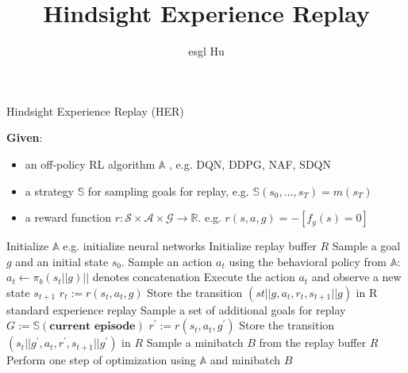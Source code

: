 \documentclass[12pt,a4paper]{article}
\begin{document}
\title{Hindsight Experience Replay}
\author{esgl Hu}
\maketitle
\begin{algorithm}
\caption{Hindsight Experience Replay (HER)}
\begin{algorithmic}
	\State \textbf{Given}: 
		\begin{itemize}
			\item an off-policy RL algorithm $\mathbb{A}$	, \Comment e.g. DQN, DDPG, NAF, SDQN
			\item a strategy $\mathbb{S}$ for sampling goals for replay,	 \Comment e.g. $\mathbb{S}(s_{0}, ..., s_{T})=m(s_{T})$
			\item a reward function $r:\mathcal{S} \times \mathcal{A} \times \mathcal{G} \rightarrow \mathbb{R}$. \Comment e.g. $r(s,a,g)=-[f_{g}(s)=0]$
		\end{itemize}
	\State Initialize $\mathbb{A}$ \Comment e.g. initialize neural networks
	\State Initialize replay buffer $R$
		\State Sample a goal $g$ and an initial state $s_{0}$.
			\State Sample an action $a_{t}$ using the behavioral policy from $\mathbb{A}$:\\\qquad\qquad\qquad$a_{t} \leftarrow \pi_{b}(s_{t}||g)$\Comment $||$ denotes concatenation
			\State Execute the action $a_t$ and observe a new state $s_{t+1}$
		\EndFor
			\State $r_t := r(s_t, a_t, g)$
			\State Store the transition $(s{t}||g, a_t, r_t, s_{t+1}||g)$ in R \Comment standard experience replay
			\State Sample a set of additional goals for replay 
			$G:= \mathbb{S}(\textbf{current episode})$
				\State $r^{'} := r(s_t, a_t, g^{'})$
				\State Store the transition $(s_{t}||g^{'}, a_{t}, r^{'}, s_{t+1}||g^{'})$ in $R$
			\EndFor
		\EndFor
			\State Sample a minibatch $B$ from the replay buffer $R$
			\State Perform one step of optimization using 
		$\mathbb{A}$ and minibatch $B$
		\EndFor
	\EndFor
	
		
\end{algorithmic}
\end{algorithm}


\end{document}
